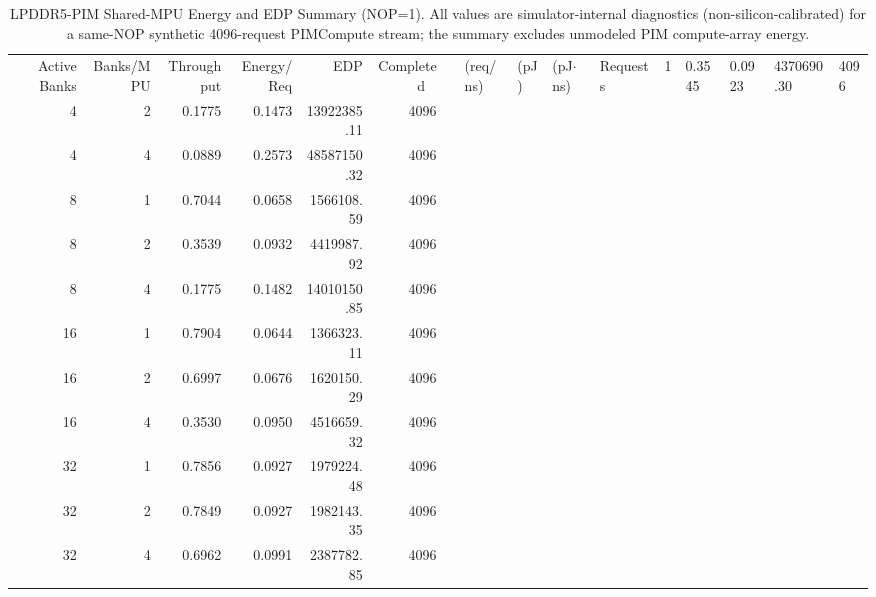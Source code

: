 \begin{table}[t]
\centering
\caption{LPDDR5-PIM Shared-MPU Energy and EDP Summary (NOP=1). All values are simulator-internal diagnostics (non-silicon-calibrated) for a same-NOP synthetic 4096-request PIMCompute stream; the summary excludes unmodeled PIM compute-array energy.}
\label{tab:p0_nop1_edp_summary}
\begin{tabular}{rrrrrr}
\toprule
Active Banks & Banks/MPU & Throughput & Energy/Req & EDP & Completed \
 &  & (req/ns) & (pJ) & (pJ$\cdot$ns) & Requests \
 & 1 & 0.3545 & 0.0923 & 4370690.30 & 4096 \\
4 & 2 & 0.1775 & 0.1473 & 13922385.11 & 4096 \\
4 & 4 & 0.0889 & 0.2573 & 48587150.32 & 4096 \\
8 & 1 & 0.7044 & 0.0658 & 1566108.59 & 4096 \\
8 & 2 & 0.3539 & 0.0932 & 4419987.92 & 4096 \\
8 & 4 & 0.1775 & 0.1482 & 14010150.85 & 4096 \\
16 & 1 & 0.7904 & 0.0644 & 1366323.11 & 4096 \\
16 & 2 & 0.6997 & 0.0676 & 1620150.29 & 4096 \\
16 & 4 & 0.3530 & 0.0950 & 4516659.32 & 4096 \\
32 & 1 & 0.7856 & 0.0927 & 1979224.48 & 4096 \\
32 & 2 & 0.7849 & 0.0927 & 1982143.35 & 4096 \\
32 & 4 & 0.6962 & 0.0991 & 2387782.85 & 4096 \\
\bottomrule
\end{tabular}
\end{table}
